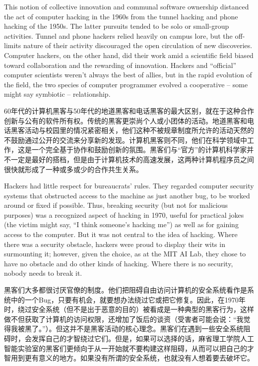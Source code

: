 \ifdefined\eng
This notion of collective innovation and communal software ownership distanced the act of computer hacking in the 1960s from the tunnel hacking and phone hacking of the 1950s. The latter pursuits tended to be solo or small-group activities. Tunnel and phone hackers relied heavily on campus lore, but the off-limits nature of their activity discouraged the open circulation of new discoveries. Computer hackers, on the other hand, did their work amid a scientific field biased toward collaboration and the rewarding of innovation. Hackers and ``official'' computer scientists weren't always the best of allies, but in the rapid evolution of the field, the two species of computer programmer evolved a cooperative -- some might say symbiotic -- relationship.
\fi

\ifdefined\chs
60年代的计算机黑客与50年代的地道黑客和电话黑客的最大区别，就在于这种合作创新与公有的软件所有权。传统的黑客更崇尚个人或小团体的活动。地道黑客和电话黑客活动与校园里的情况紧密相关，他们这种不被规章制度所允许的活动天然的不鼓励通过公开的交流来分享新的发现。计算机黑客则不同，他们在科学领域中工作，这是一个完全基于协作和鼓励创新的氛围。黑客们与“官方”的计算机科学家并不一定是最好的搭档，但是由于计算机技术的高速发展，这两种计算机程序员之间很快就形成了一种或多或少的合作共生关系。
\fi

\ifdefined\eng
Hackers had little respect for bureaucrats' rules.  They regarded computer security systems that obstructed access to the machine as just another bug, to be worked around or fixed if possible.  Thus, breaking security (but not for malicious purposes) was a recognized aspect of hacking in 1970, useful for practical jokes (the victim might say, ``I think someone's hacking me'') as well as for gaining access to the computer.  But it was not central to the idea of hacking.  Where there was a security obstacle, hackers were proud to display their wits in surmounting it; however, given the choice, as at the MIT AI Lab, they chose to have no obstacle and do other kinds of hacking.  Where there is no security, nobody needs to break it.
\fi

\ifdefined\chs
黑客们大多都很讨厌官僚的制度。他们把阻碍自由访问计算机的安全系统看作是系统中的一个Bug，只要有机会，就要想办法绕过它或把它修复。因此，在1970年时，绕过安全系统（但不是出于恶意的目的）被看成是一种典型的黑客行为，这样做不但获取了计算机的访问权限，还增加了饭后的谈资（受害者可能会说：“我觉得我被黑了。”）。但这并不是黑客活动的核心理念。黑客们在遇到一些安全系统阻碍时，会发挥自己的才智绕过它们。但是，如果可以选择的话，麻省理工学院人工智能实验室的黑客们更倾向于从一开始就不要构建这样阻碍，从而可以把自己的才智用到更有意义的地方。如果没有所谓的安全系统，也就没有人想着要去破坏它。
\fi

